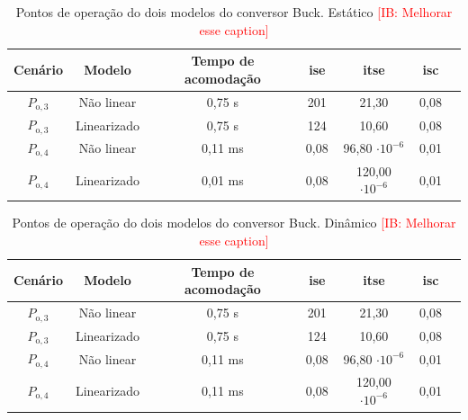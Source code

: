 \vspace{8pt}
\begin{table}[H]
  \centering
  \setlength{\tabcolsep}{10pt}
  \begin{tabular}{ccccccc}
    \toprule
    Cenário & Modelo      & Tempo de acomodação & \acrshort{ise} & \acrshort{itse}        & \acrshort{isc} \\
    \midrule
    $P_{\mathrm{o}, 3}$       & Não linear  & 0,75 s              & 201            & 21,30                  & 0,08           \\
    $P_{\mathrm{o}, 3}$       & Linearizado & 0,75 s              & 124            & 10,60                  & 0,08           \\
    $P_{\mathrm{o}, 4}$       & Não linear  & 0,11 ms             & 0,08           & 96,80 $\cdot 10^{-6}$  & 0,01           \\
    $P_{\mathrm{o}, 4}$       & Linearizado & 0,01 ms             & 0,08           & 120,00 $\cdot 10^{-6}$ & 0,01           \\
    \bottomrule
  \end{tabular}
  \caption{Pontos de operação do dois modelos do conversor Buck. Estático \textcolor{red}{[IB: Melhorar esse caption]}}
  \label{table:indices_desempenho_etm_estático_boost}
\end{table}

\vspace{8pt}
\begin{table}[H]
  \centering
  \setlength{\tabcolsep}{10pt}
  \begin{tabular}{ccccccc}
    \toprule
    Cenário & Modelo      & Tempo de acomodação & \acrshort{ise} & \acrshort{itse}        & \acrshort{isc} \\
    \midrule
    $P_{\mathrm{o}, 3}$       & Não linear  & 0,75 s              & 201            & 21,30                  & 0,08           \\
    $P_{\mathrm{o}, 3}$       & Linearizado & 0,75 s              & 124            & 10,60                  & 0,08           \\
    $P_{\mathrm{o}, 4}$       & Não linear  & 0,11 ms             & 0,08           & 96,80 $\cdot 10^{-6}$  & 0,01           \\
    $P_{\mathrm{o}, 4}$       & Linearizado & 0,11 ms             & 0,08           & 120,00 $\cdot 10^{-6}$ & 0,01           \\
    \bottomrule
  \end{tabular}
  \caption{Pontos de operação do dois modelos do conversor Buck. Dinâmico \textcolor{red}{[IB: Melhorar esse caption]} }
  \label{table:indices_desempenho_etm_dinamico_boost}
\end{table}
